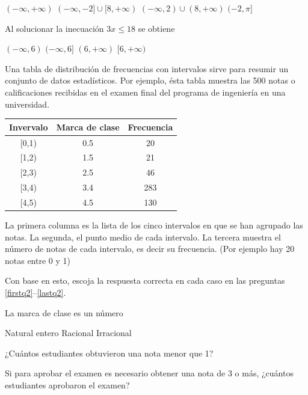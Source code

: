 \documentclass[10pt,letterpaper,addpoints]{exam}
\begin{document}
\begin{multicols}{2}
\begin{questions}
\begin{choices}
 \choice $(-\infty,+\infty)$
 \CorrectChoice $(-\infty,-2]\cup [8,+\infty)$
 \choice $(-\infty,2)\cup (8,+\infty)$
 \choice $(-2,\pi]$
\end{choices}
\question Al solucionar la inecuación $3x\leq 18$ se obtiene
\begin{choices}
\begin{multicols}{2}
 \choice $(-\infty,6)$
 \CorrectChoice $(-\infty,6]$
 \choice $(6,+\infty)$
 \choice $[6,+\infty)$
\end{multicols}
\end{choices}
\begin{uplevel}{
 Una tabla de distribución de frecuencias con intervalos sirve para resumir un conjunto de datos estadísticos. Por ejemplo, ésta tabla muestra las 500 notas o calificaciones recibidas en el examen final del programa de ingeniería en una universidad.
\begin{center}
\begin{tabular}{|c|c|c|}\hline
Invervalo & Marca de clase & Frecuencia\\ \hline
[0,1) & 0.5 & 20\\ \hline
[1,2) & 1.5 & 21\\ \hline
[2,3) & 2.5 & 46\\ \hline
[3,4) & 3.4 & 283\\ \hline
[4,5) & 4.5 & 130\\ \hline
 \end{tabular}
 \end{center}
 La primera columna es la lista de los cinco intervalos en que se han agrupado las notas. La segunda, el punto medio de cada intervalo. La tercera muestra el número de notas de cada intervalo, es decir su frecuencia. (Por ejemplo hay 20 notas entre 0 y 1)
 
 Con base en esto, escoja la respuesta correcta en cada caso en las preguntas \ref{firstq2}--\ref{lastq2}.}
\end{uplevel}
\question \label{firstq2} La marca de clase es un número
\begin{choices}
\begin{multicols}{2}
 \choice Natural
 \choice entero
 \CorrectChoice Racional
 \choice Irracional
\end{multicols}
\end{choices}
\question ¿Cuántos estudiantes obtuvieron una nota menor que 1?

\begin{oneparchoices}
\end{oneparchoices}
\question Si para aprobar el examen es necesario obtener una nota de 3 o más, ¿cuántos estudiantes aprobaron el examen?


\end{questions}
\end{multicols}
\end{document}
